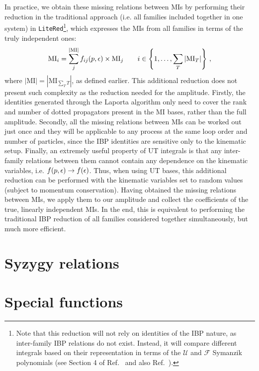\documentclass[main.tex]{subfiles}
\begin{document}
In practice, we obtain these missing relations between MIs by performing their reduction in the traditional approach (i.e. all families included together in one system) in \texttt{LiteRed}\footnote{Note that this reduction will not rely on identities of the IBP nature, as inter-family IBP relations do not exist. Instead, it will compare different integrals based on their representation in terms of the $\mathcal{U}$ and $\mathcal{F}$ Symanzik polynomials (see Section 4 of Ref.~\cite{Lee:2012cn} and also Ref.~\cite{Pak:2011xt}).}, which expresses the MIs from all families in terms of the truly independent ones:
\begin{equation}
    \text{MI}_{i} = \sum_j^{|\text{MI}|} f_{ij}(p, \epsilon) \times \text{MI}_j \qquad i \in \left\{1, \ldots, \sum_T |\text{MI}_T|\right\}\,,
\end{equation}
where $|\text{MI}| = |\text{MI}_{\sum_T T}|$, as defined earlier. This additional reduction does not present such complexity as the reduction needed for the amplitude. Firstly, the identities generated through the Laporta algorithm only need to cover the rank and number of dotted propagators present in the MI bases, rather than the full amplitude. Secondly, all the missing relations between MIs can be worked out just once and they will be applicable to any process at the same loop order and number of particles, since the IBP identities are sensitive only to the kinematic setup. Finally, an extremely useful property of UT integrals is that any inter-family relations between them cannot contain any dependence on the kinematic variables, i.e. $f(p, \epsilon) \rightarrow f(\epsilon)$. Thus, when using UT bases, this additional reduction can be performed with the kinematic variables set to random values (subject to momentum conservation). Having obtained the missing relations between MIs, we apply them to our amplitude and collect the coefficients of the true, linearly independent MIs. In the end, this is equivalent to performing the traditional IBP reduction of all families considered together simultaneously, but much more efficient.
\section{Syzygy relations} \label{sec:syzygies} 
%
\section{Special functions} \label{sec:specialfunctions}
\end{document}
